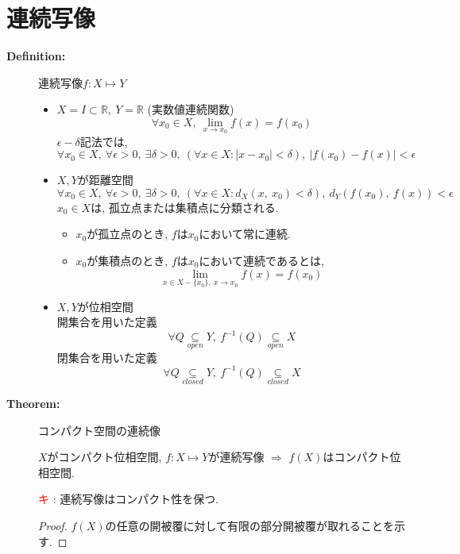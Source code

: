 \documentclass[dvipdfmx]{jsarticle}
\newcommand{\point}{\textcircled{\textcolor{red}{\scriptsize キ}} }
\begin{document}
\section{連続写像}
\begin{description}
    \item[\bf{Definition:}] 連続写像$f : X \mapsto Y$
        \begin{itemize}
            \item $X = I \subset \mathbb{R},\ Y = \mathbb{R}$ (実数値連続関数)
                $$ \forall x_0 \in X,\ \lim_{x \to x_0} f(x) = f(x_0) $$
                $\epsilon-\delta$記法では, 
                $$ \forall x_0 \in X,\ \forall \epsilon > 0,\ \exists \delta > 0,\ ( \forall x \in X : |x - x_0 | < \delta ),\ | f(x_0) - f(x) | < \epsilon $$
            \item $X, Y$が距離空間
                $$ \forall x_0 \in X,\ \forall \epsilon > 0,\ \exists \delta > 0,\ ( \forall x \in X : d_X(x,\ x_0) < \delta),\ d_Y(f(x_0),\ f(x)) < \epsilon $$
                $x_0 \in X$は, 孤立点または集積点に分類される.
                \begin{itemize}
                    \item $x_0$が孤立点のとき, $f$は$x_0$において常に連続.
                    \item $x_0$が集積点のとき, $f$は$x_0$において連続であるとは, 
                        $$ \displaystyle \lim_{ x \in X - \{ x_0 \} ,\ x \to x_0} f(x) = f(x_0) $$
                \end{itemize}
            \item $X, Y$が位相空間 \\
                開集合を用いた定義
                $$ \forall Q \underset{open}{\subseteq} Y,\  f^{-1}(Q) \underset{open}{\subseteq} X$$
                閉集合を用いた定義
                $$ \forall Q \underset{closed}{\subseteq} Y,\  f^{-1}(Q) \underset{closed}{\subseteq} X$$
        \end{itemize}
    
    \item[\bf{Theorem:}] コンパクト空間の連続像
    \begin{center}$X$がコンパクト位相空間, $f : X \mapsto Y$が連続写像 $\Rightarrow$ $f(X)$はコンパクト位相空間. \end{center}
        \point : 連続写像はコンパクト性を保つ. \\
        \begin{proof}
            $f(X)$の任意の開被覆に対して有限の部分開被覆が取れることを示す.
        \end{proof}


\end{description}
\end{document}

